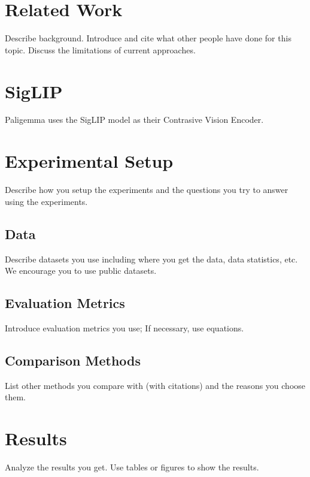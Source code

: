 \documentclass{article}
\begin{document}
\section{Related Work}
Describe background. Introduce and cite what other people have done for this topic. Discuss the limitations of current approaches.

\section{SigLIP}
Paligemma uses the SigLIP model\cite{zhai2023sigmoid} as their Contrasive Vision Encoder. 



\section{Experimental Setup}
Describe how you setup the experiments and the questions you try to answer using the experiments.
\subsection{Data}
Describe datasets you use including where you get the data, data statistics, etc. We encourage you to use public datasets.
\subsection{Evaluation Metrics}
Introduce evaluation metrics you use; If necessary, use equations.
\subsection{Comparison Methods}
List other methods you compare with (with citations) and the reasons you choose them.

\section{Results}
Analyze the results you get. Use tables or figures to show the results.
\begin{footnotesize}


\end{footnotesize}%
\end{document}
